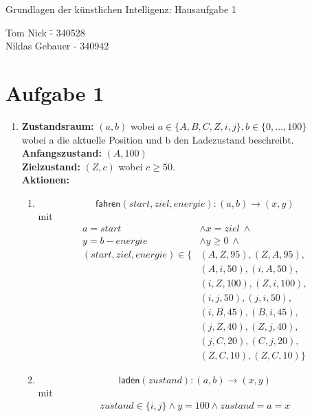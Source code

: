 \documentclass[a4paper,10pt]{article}
\begin{document}
\begin{center}
\Large{Grundlagen der künstlichen Intelligenz: Hausaufgabe 1} \\
\end{center}
\begin{tabbing}
Tom Nick \hspace{2cm}\= - 340528\\
Niklas Gebauer \> - 340942 \\
\end{tabbing}

\section*{Aufgabe 1}

\begin{enumerate}[~~a)]
    \item
    \textbf{Zustandsraum:} 
    $(a, b)$ wobei $ a \in \{A, B, C, Z, i, j\}, b \in \{0,\dots,100\} $ \\
    wobei a die aktuelle Position und b den Ladezustand beschreibt. \\
    \textbf{Anfangszustand:}
    $(A,100)$ \\
    \textbf{Zielzustand:}
    $(Z,c)$ wobei $c \ge 50$. \\
    \textbf{Aktionen:}
    \begin{enumerate}[~~1.]
    \item $$\textsf{fahren}(start, ziel, energie): (a, b) \rightarrow (x, y)$$ 
    mit 
    \begin{align*}
        a = start &\land x = ziel ~\land \\
        y = b - energie  &\land y \ge 0 ~\land\\
        (start, ziel, energie)  \in \{&(A, Z, 95), (Z, A, 95),\\
        &(A,i,50), (i,A,50),\\
        &(i,Z,100), (Z,i,100),\\
        &(i,j,50), (j,i,50),\\
        &(i,B,45), (B,i,45),\\
        &(j,Z,40), (Z,j,40),\\
        &(j,C,20), (C,j,20),\\
        &(Z,C,10), (Z,C,10)\}
    \end{align*}
    \item $$\textsf{laden}(zustand): (a, b) \rightarrow (x, y)$$ 
    mit 
    \begin{align*}
        zustand \in \{ i, j \} \land y = 100 \land zustand = a = x

\end{align*}
\end{enumerate}
\end{enumerate}
\end{document}
